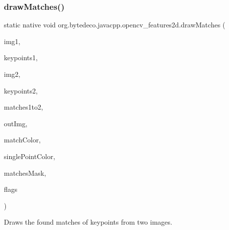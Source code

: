 \subsubsection{\texorpdfstring{draw\+Matches()}{drawMatches()}}
{\footnotesize\ttfamily static native void org.\+bytedeco.\+javacpp.\+opencv\+\_\+features2d.\+draw\+Matches (\begin{DoxyParamCaption}\item[{@By\+Val Mat}]{img1,  }\item[{@Const @By\+Ref Key\+Point\+Vector}]{keypoints1,  }\item[{@By\+Val Mat}]{img2,  }\item[{@Const @By\+Ref Key\+Point\+Vector}]{keypoints2,  }\item[{@Const @By\+Ref D\+Match\+Vector}]{matches1to2,  }\item[{@By\+Val Mat}]{out\+Img,  }\item[{@Const @By\+Ref(null\+Value=\char`\"{}cv\+::\+Scalar\+::all(-\/1)\char`\"{}) Scalar}]{match\+Color,  }\item[{@Const @By\+Ref(null\+Value=\char`\"{}cv\+::\+Scalar\+::all(-\/1)\char`\"{}) Scalar}]{single\+Point\+Color,  }\item[{@Cast(\char`\"{}char$\ast$\char`\"{}) @Std\+Vector Byte\+Pointer}]{matches\+Mask,  }\item[{int}]{flags }\end{DoxyParamCaption})\hspace{0.3cm}{\ttfamily [static]}}



Draws the found matches of keypoints from two images. 


